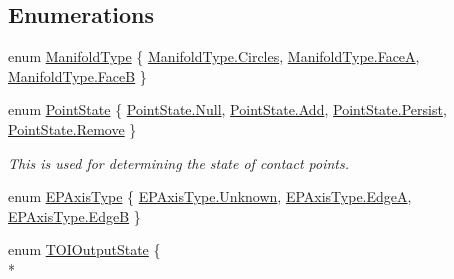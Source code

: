 \subsection*{Enumerations}
\begin{DoxyCompactItemize}
\item 
enum \hyperlink{namespace_farseer_physics_1_1_collision_a7020490145ac65404675bdce1ebeafae}{Manifold\+Type} \{ \hyperlink{namespace_farseer_physics_1_1_collision_a7020490145ac65404675bdce1ebeafaea0b746483cd6f7830702edd6ee7d8d4b9}{Manifold\+Type.\+Circles}, 
\hyperlink{namespace_farseer_physics_1_1_collision_a7020490145ac65404675bdce1ebeafaeaf43c8682b4637a32c3fd76348733a5b0}{Manifold\+Type.\+Face\+A}, 
\hyperlink{namespace_farseer_physics_1_1_collision_a7020490145ac65404675bdce1ebeafaea9d0245173cf584f064c34d2be4718f0d}{Manifold\+Type.\+Face\+B}
 \}
\item 
enum \hyperlink{namespace_farseer_physics_1_1_collision_a223f39caed05fa155633a0f519117a42}{Point\+State} \{ \hyperlink{namespace_farseer_physics_1_1_collision_a223f39caed05fa155633a0f519117a42abbb93ef26e3c101ff11cdd21cab08a94}{Point\+State.\+Null}, 
\hyperlink{namespace_farseer_physics_1_1_collision_a223f39caed05fa155633a0f519117a42aec211f7c20af43e742bf2570c3cb84f9}{Point\+State.\+Add}, 
\hyperlink{namespace_farseer_physics_1_1_collision_a223f39caed05fa155633a0f519117a42a5a7dacb6e9b5ba37e22f825429355174}{Point\+State.\+Persist}, 
\hyperlink{namespace_farseer_physics_1_1_collision_a223f39caed05fa155633a0f519117a42a1063e38cb53d94d386f21227fcd84717}{Point\+State.\+Remove}
 \}
\begin{DoxyCompactList}\small\item\em This is used for determining the state of contact points. \end{DoxyCompactList}\item 
enum \hyperlink{namespace_farseer_physics_1_1_collision_a8c0daff3dfe362c5f50bb4f69ebb8fe9}{E\+P\+Axis\+Type} \{ \hyperlink{namespace_farseer_physics_1_1_collision_a8c0daff3dfe362c5f50bb4f69ebb8fe9a88183b946cc5f0e8c96b2e66e1c74a7e}{E\+P\+Axis\+Type.\+Unknown}, 
\hyperlink{namespace_farseer_physics_1_1_collision_a8c0daff3dfe362c5f50bb4f69ebb8fe9a2a187552a4c67d367110e85ea0087a4d}{E\+P\+Axis\+Type.\+Edge\+A}, 
\hyperlink{namespace_farseer_physics_1_1_collision_a8c0daff3dfe362c5f50bb4f69ebb8fe9a0a2d24d621ca67652605108f4d4eac97}{E\+P\+Axis\+Type.\+Edge\+B}
 \}
\item 
enum \hyperlink{namespace_farseer_physics_1_1_collision_a5de703d53ee92998e8d95e1ee51613d8}{T\+O\+I\+Output\+State} \{ \\*

\end{DoxyCompactItemize}
